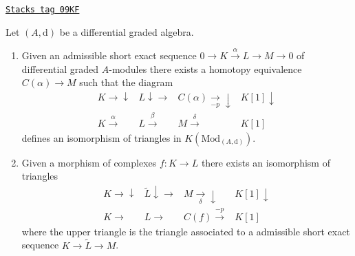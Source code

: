 \begin{lemma}
\label{dga-lemma-the-same-up-to-isomorphisms}
\href{https://stacks.math.columbia.edu/tag/09KF}{\texttt{Stacks tag 09KF}}

Let $(A, \text{d})$ be a differential graded algebra.
\begin{enumerate}
\item Given an admissible short exact sequence
$0 \to K \xrightarrow{\alpha} L \to M \to 0$
of differential graded $A$-modules there exists a homotopy equivalence
$C(\alpha) \to M$ such that the diagram
$$
\begin{array}{cccc}K \longrightarrow\downarrow & L \downarrow\longrightarrow & C(\alpha) \underset{-p}{\longrightarrow}\downarrow & K[1] \downarrow \\ K \overset{\alpha}{\longrightarrow} & L \overset{\beta}{\longrightarrow} & M \overset{\delta}{\longrightarrow} & K[1]\end{array}
$$
defines an isomorphism of triangles in $K(\text{Mod}_{(A, \text{d})})$.
\item Given a morphism of complexes $f : K \to L$
there exists an isomorphism of triangles
$$
\begin{array}{cccc}K \longrightarrow\downarrow & \tilde L \downarrow\longrightarrow & M \underset{\delta}{\longrightarrow}\downarrow & K[1] \downarrow \\ K \longrightarrow & L \longrightarrow & C(f) \overset{-p}{\longrightarrow} & K[1]\end{array}
$$
where the upper triangle is the triangle associated to a
admissible short exact sequence $K \to \tilde L \to M$.
\end{enumerate}
\end{lemma}

